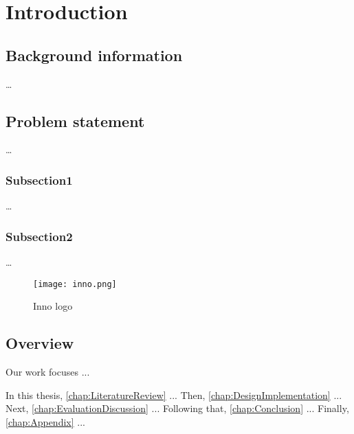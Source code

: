 \chapter{Introduction}
\label{chap:intro}


\section{Background information}
\label{chap:Introduction:BackgroundInformation}

\dots

\section{Problem statement}
\label{chap:Introduction:ProblemStatement}

\dots

\subsection{Subsection1}
\label{chap:Introduction:ProblemStatement:Subsection1}

\dots

\subsection{Subsection2}
\label{chap:Introduction:ProblemStatement:Subsection2}

\dots

\begin{figure}[h]
  \centering
  \texttt{[image: inno.png]}
  \caption{Inno logo}
  \label{chap:Introduction:fig:Inno}
\end{figure}

\section{Overview}

Our work focuses ...

In this thesis, \cref{chap:LiteratureReview} ...
Then, \cref{chap:DesignImplementation} ...
Next, \cref{chap:EvaluationDiscussion} ...
Following that, \cref{chap:Conclusion} ...
Finally, \cref{chap:Appendix} ...
